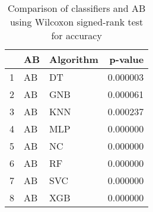 \begin{table}
\footnotesize
\caption{Comparison of classifiers and AB using Wilcoxon signed-rank test for accuracy}
\label{tab:AB wilcoxon ACC comparison}
\begin{tabular}{lllr}
\hline
 & AB & Algorithm & p-value \\
\hline
1 & AB & DT & 0.000003 \\
2 & AB & GNB & 0.000061 \\
3 & AB & KNN & 0.000237 \\
4 & AB & MLP & 0.000000 \\
5 & AB & NC & 0.000000 \\
6 & AB & RF & 0.000000 \\
7 & AB & SVC & 0.000000 \\
8 & AB & XGB & 0.000000 \\
\hline
\end{tabular}
\end{table}

